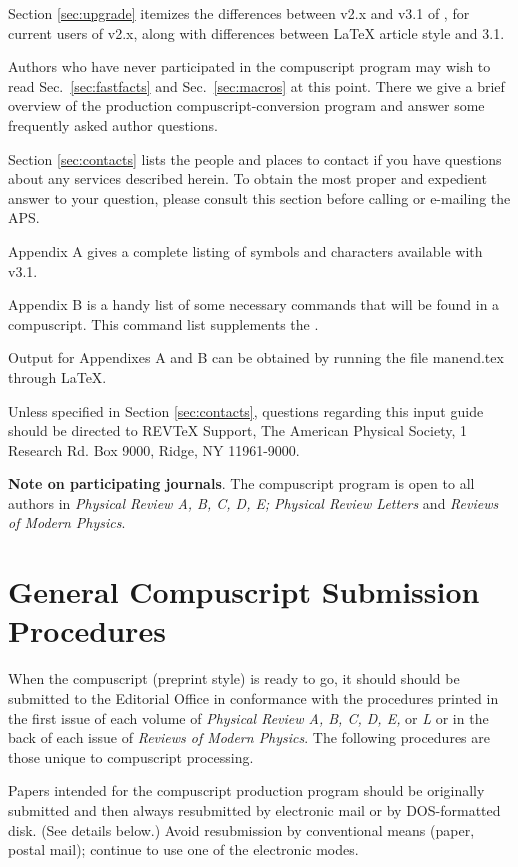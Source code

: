 Section \ref{sec:upgrade} itemizes the differences between v2.x and v3.1 of
\REVTeX{}, for current users of v2.x, along with differences between
\LaTeX{} article style and \REVTeX{} 3.1.

Authors who have never participated in the compuscript program may wish
to read Sec.\ \ref{sec:fastfacts} and  Sec.\ \ref{sec:macros} at this
point. There we give a brief overview of the production
compuscript-conversion  program and
answer some frequently asked author questions.

Section \ref{sec:contacts} lists the people and places to contact if you
have questions about any services described herein.  To obtain the most
proper and expedient answer to your question, please consult this section
before calling or e-mailing the APS.

Appendix A gives a complete listing of symbols and characters available
with \REVTeX{} v3.1.

Appendix B is a handy  list of some necessary commands that will be found
in a \REVTeX{} compuscript.  This command list supplements the \LUG{}.

Output for Appendixes A and B can be obtained by running the file
manend.tex through \LaTeX.

Unless specified in Section \ref{sec:contacts}, questions regarding this
input guide should be directed to REV\TeX\/ Support, The American
Physical Society, 1 Research Rd. Box 9000, Ridge, NY 11961-9000.
%


{\bf Note on participating journals}.
The compuscript program is open to all authors in {\em Physical Review A,
B, C, D, E;} {\em Physical Review Letters} and {\em Reviews of Modern Physics}.


\section{General Compuscript Submission Procedures}
\label{sec:gensubmit}

When the \REVTeX{} compuscript (preprint style) is ready to go, it should
should be submitted to the Editorial Office in conformance with the
procedures printed in the first issue of each volume of {\em Physical
Review A, B, C, D, E,} or {\em L} or in the back of each issue of {\em
Reviews of Modern Physics}. The following procedures are those
unique to compuscript processing.

Papers intended for the compuscript production program should be
originally submitted and then always resubmitted by electronic mail or
by DOS-formatted disk. (See details below.) Avoid resubmission by
conventional means (paper, postal mail); continue to use one of the
electronic modes.

